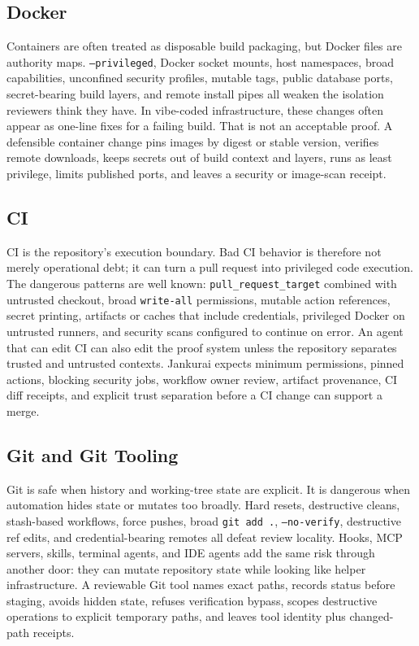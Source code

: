 \subsection{Docker}

Containers are often treated as disposable build packaging, but Docker files are authority maps. \texttt{--privileged}, Docker socket mounts, host namespaces, broad capabilities, unconfined security profiles, mutable tags, public database ports, secret-bearing build layers, and remote install pipes all weaken the isolation reviewers think they have. In vibe-coded infrastructure, these changes often appear as one-line fixes for a failing build. That is not an acceptable proof. A defensible container change pins images by digest or stable version, verifies remote downloads, keeps secrets out of build context and layers, runs as least privilege, limits published ports, and leaves a security or image-scan receipt.

\subsection{CI}

CI is the repository's execution boundary. Bad CI behavior is therefore not merely operational debt; it can turn a pull request into privileged code execution. The dangerous patterns are well known: \texttt{pull\_request\_target} combined with untrusted checkout, broad \texttt{write-all} permissions, mutable action references, secret printing, artifacts or caches that include credentials, privileged Docker on untrusted runners, and security scans configured to continue on error. An agent that can edit CI can also edit the proof system unless the repository separates trusted and untrusted contexts. Jankurai expects minimum permissions, pinned actions, blocking security jobs, workflow owner review, artifact provenance, CI diff receipts, and explicit trust separation before a CI change can support a merge.

\subsection{Git and Git Tooling}

Git is safe when history and working-tree state are explicit. It is dangerous when automation hides state or mutates too broadly. Hard resets, destructive cleans, stash-based workflows, force pushes, broad \texttt{git add .}, \texttt{--no-verify}, destructive ref edits, and credential-bearing remotes all defeat review locality. Hooks, MCP servers, skills, terminal agents, and IDE agents add the same risk through another door: they can mutate repository state while looking like helper infrastructure. A reviewable Git tool names exact paths, records status before staging, avoids hidden state, refuses verification bypass, scopes destructive operations to explicit temporary paths, and leaves tool identity plus changed-path receipts.

